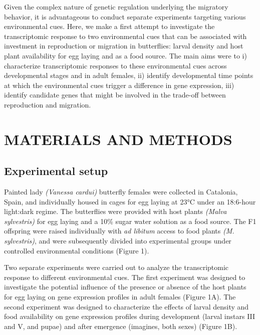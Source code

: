 \documentclass[lineno]{wiley-article}
\begin{document}
Given the complex nature of genetic regulation underlying the migratory behavior, it is advantageous to conduct separate experiments targeting various environmental cues. Here, we make a first attempt to investigate the transcriptomic response to two environmental cues that can be associated with investment in reproduction or migration in butterflies: larval density and host plant availability for egg laying and as a food source. The main aims were to i) characterize transcriptomic responses to these environmental cues across developmental stages and in adult females, ii) identify developmental time points at which the environmental cues trigger a difference in gene expression, iii) identify candidate genes that might be involved in the trade-off between reproduction and migration.

\section{MATERIALS AND METHODS}
\subsection{Experimental setup}
Painted lady \textit{(Vanessa cardui)} butterfly females were collected in Catalonia, Spain, and individually housed in cages for egg laying at 23°C under an 18:6-hour light:dark regime. The butterflies were provided with host plants \textit{(Malva sylvestris)} for egg laying and a 10\% sugar water solution as a food source. The F1 offspring were raised individually with \textit{ad libitum} access to food plants \textit{(M. sylvestris)}, and were subsequently divided into experimental groups under controlled environmental conditions (Figure 1). 

Two separate experiments were carried out to analyze the transcriptomic response to different environmental cues. The first experiment was designed to investigate the potential influence of the presence or absence of the host plants for egg laying on gene expression profiles in adult females (Figure 1A). The second experiment was designed to characterize the effects of larval density and food availability on gene expression profiles during development (larval instars III and V, and pupae) and after emergence (imagines, both sexes) (Figure 1B).
\end{document}
